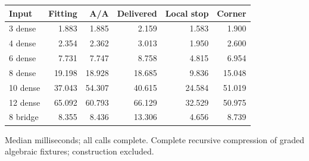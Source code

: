 \begin{center}\small
\begin{tabular}{@{}lrrrrr@{}}
\toprule
Input & Fitting & A/A & Delivered & Local stop & Corner \\
\midrule
3 dense & 1.883 & 1.885 & 2.159 & 1.583 & 1.900 \\
4 dense & 2.354 & 2.362 & 3.013 & 1.950 & 2.600 \\
6 dense & 7.731 & 7.747 & 8.758 & 4.815 & 6.954 \\
8 dense & 19.198 & 18.928 & 18.685 & 9.836 & 15.048 \\
10 dense & 37.043 & 54.307 & 40.615 & 24.584 & 51.019 \\
12 dense & 65.092 & 60.793 & 66.129 & 32.529 & 50.975 \\
8 bridge & 8.355 & 8.436 & 13.306 & 4.656 & 8.739 \\
\bottomrule
\end{tabular}
\end{center}
Median milliseconds; all calls complete. Complete recursive compression of graded algebraic fixtures; construction excluded.
